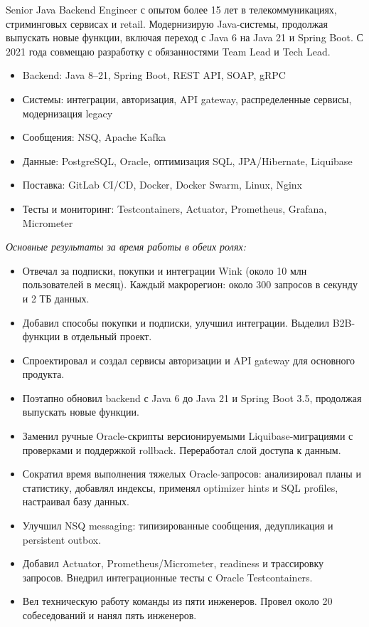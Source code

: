 Senior Java Backend Engineer с опытом более 15 лет в телекоммуникациях, стриминговых
сервисах и retail. Модернизирую Java-системы, продолжая выпускать новые функции,
включая переход с Java 6 на Java 21 и Spring Boot. С 2021 года совмещаю разработку
с обязанностями Team Lead и Tech Lead.

\begin{itemize}[leftmargin=1.3em, itemsep=0.2em]
  \item Backend: Java 8--21, Spring Boot, REST API, SOAP, gRPC
  \item Системы: интеграции, авторизация, API gateway, распределенные сервисы, модернизация legacy
  \item Сообщения: NSQ, Apache Kafka
  \item Данные: PostgreSQL, Oracle, оптимизация SQL, JPA/Hibernate, Liquibase
  \item Поставка: GitLab CI/CD, Docker, Docker Swarm, Linux, Nginx
  \item Тесты и мониторинг: Testcontainers, Actuator, Prometheus, Grafana, Micrometer
\end{itemize}

\textit{Основные результаты за время работы в обеих ролях:}
\begin{itemize}[leftmargin=1.3em, itemsep=0.2em]
  \item Отвечал за подписки, покупки и интеграции Wink (около 10 млн пользователей в месяц). Каждый макрорегион: около 300 запросов в секунду и 2 ТБ данных.
  \item Добавил способы покупки и подписки, улучшил интеграции. Выделил B2B-функции в отдельный проект.
  \item Спроектировал и создал сервисы авторизации и API gateway для основного продукта.
  \item Поэтапно обновил backend с Java 6 до Java 21 и Spring Boot 3.5, продолжая выпускать новые функции.
  \item Заменил ручные Oracle-скрипты версионируемыми Liquibase-миграциями с проверками и поддержкой rollback. Переработал слой доступа к данным.
  \item Сократил время выполнения тяжелых Oracle-запросов: анализировал планы и статистику, добавлял индексы, применял optimizer hints и SQL profiles, настраивал базу данных.
  \item Улучшил NSQ messaging: типизированные сообщения, дедупликация и persistent outbox.
  \item Добавил Actuator, Prometheus/Micrometer, readiness и трассировку запросов. Внедрил интеграционные тесты с Oracle Testcontainers.
  \item Вел техническую работу команды из пяти инженеров. Провел около 20 собеседований и нанял пять инженеров.
\end{itemize}


